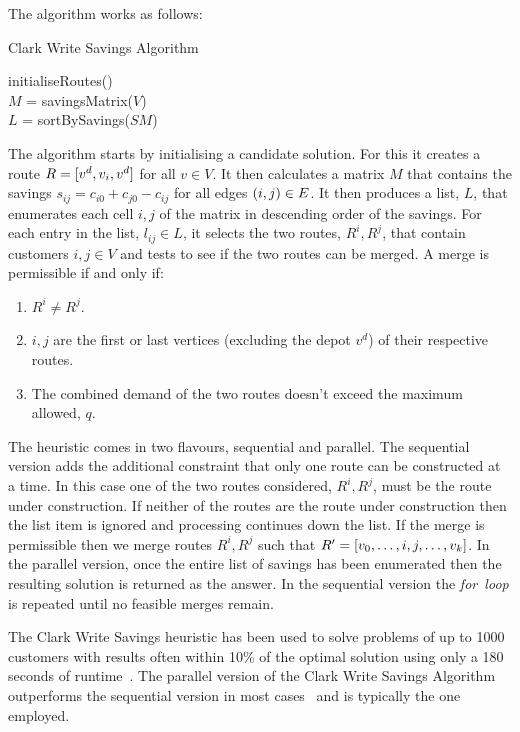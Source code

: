 The algorithm works as follows:

\begin{algorithm}[H]
   \caption{Clark Write Savings Algorithm}
   initialiseRoutes()\\
   $M$ = savingsMatrix($V$)\\
   $L$ = sortBySavings($SM$)\\
\end{algorithm}

The algorithm starts by initialising a candidate solution. For this it creates a route $R = [v^d, v_i, v^d]$ for all $v \in V$. It then calculates a matrix $M$ that contains the savings $s_{ij} = c_{i0} + c_{j0} - c_{ij}$ for all edges $(i,j) \in E$. It then produces a list, $L$, that enumerates each cell $i,j$ of the matrix in descending order of the savings. For each entry in the list, $l_{ij} \in L$, it selects the two routes, $R^i, R^j$, that contain customers $i,j \in V$ and tests to see if the two routes can be merged. A merge is permissible if and only if:

\begin{enumerate}
   \item $R^i \neq R^j$.
   \item $i,j$ are the first or last vertices (excluding the depot $v^d$) of their respective routes.
   \item The combined demand of the two routes doesn't exceed the maximum allowed, $q$.
\end{enumerate}

The heuristic comes in two flavours, sequential and parallel. The sequential version adds the additional constraint that only one route can be constructed at a time. In this case one of the two routes considered, $R^i, R^j$, must be the route under construction. If neither of the routes are the route under construction then the list item is ignored and processing continues down the list. If the merge is permissible then we merge routes $R^i, R^j$ such that $R' = [v_0,\ldots,i,j,\ldots,v_k]$. In the parallel version, once the entire list of savings has been enumerated then the resulting solution is returned as the answer. In the sequential version the \emph{for~loop} is repeated until no feasible merges remain.

The Clark Write Savings heuristic has been used to solve problems of up to 1000 customers with results often within 10\% of the optimal solution using only a 180 seconds of runtime~\cite{TV2001}. The parallel version of the Clark Write Savings Algorithm outperforms the sequential version in most cases~\cite{Laporte:1999} and is typically the one employed.

